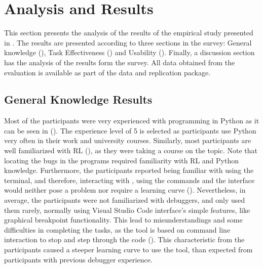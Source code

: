 
\section{Analysis and Results}
\label{sec:results}

This section presents the analysis of the results of the empirical study presented in 
. The results are presented according to three sections in the survey: General 
knowledge (), Task Effectiveness () and Usability 
(). Finally, a discussion section has the analysis of the results form the survey. All data obtained from the evaluation is available as part of the data and replication  package.


\subsection{General Knowledge Results}
\label{sec:general-knowledge}

Most of the participants were very experienced with programming in Python as it can be seen in (). The experience level of 5 is selected as participants use Python very often in their work and university courses. Similarly, most participants are well familiarized with \ac{RL} (), as they were taking a course on the topic. Note that locating the bugs in the programs required familiarity with \ac{RL} and Python knowledge. Furthermore, the participants reported being familiar  with using the terminal, and therefore, interacting with \flik, using the commands and the interface would neither pose a problem nor require a learning curve (). Nevertheless, in average, the participants were not familiarized with debuggers, and only used them  rarely, normally using Visual Studio Code interface's simple features, like graphical breakpoint functionality. This lead to misunderstandings and some difficulties in completing the tasks, as the  tool is based on command line interaction to stop and step through the code (). This characteristic from the participants caused a steeper learning curve to use the tool, than expected from participants with previous debugger experience.

